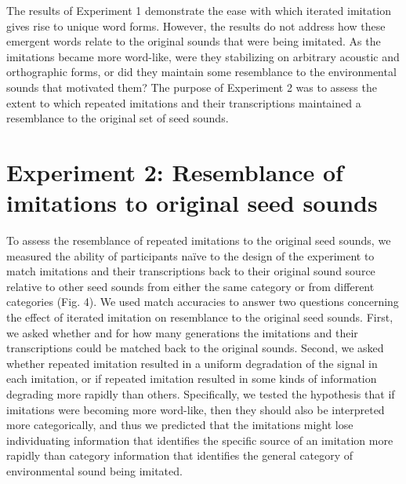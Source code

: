 \documentclass[english,floatsintext,man]{apa6}
\theoremstyle{definition}
\theoremstyle{definition}
\theoremstyle{remark}
\begin{document}
The results of Experiment 1 demonstrate the ease with which iterated
imitation gives rise to unique word forms. However, the results do not
address how these emergent words relate to the original sounds that were
being imitated. As the imitations became more word-like, were they
stabilizing on arbitrary acoustic and orthographic forms, or did they
maintain some resemblance to the environmental sounds that motivated
them? The purpose of Experiment 2 was to assess the extent to which
repeated imitations and their transcriptions maintained a resemblance to
the original set of seed sounds.

\section{Experiment 2: Resemblance of imitations to original seed
sounds}\label{experiment-2-resemblance-of-imitations-to-original-seed-sounds}

To assess the resemblance of repeated imitations to the original seed
sounds, we measured the ability of participants naïve to the design of
the experiment to match imitations and their transcriptions back to
their original sound source relative to other seed sounds from either
the same category or from different categories (Fig. 4). We used match
accuracies to answer two questions concerning the effect of iterated
imitation on resemblance to the original seed sounds. First, we asked
whether and for how many generations the imitations and their
transcriptions could be matched back to the original sounds. Second, we
asked whether repeated imitation resulted in a uniform degradation of
the signal in each imitation, or if repeated imitation resulted in some
kinds of information degrading more rapidly than others. Specifically,
we tested the hypothesis that if imitations were becoming more
word-like, then they should also be interpreted more categorically, and
thus we predicted that the imitations might lose individuating
information that identifies the specific source of an imitation more
rapidly than category information that identifies the general category
of environmental sound being imitated.
\end{document}
